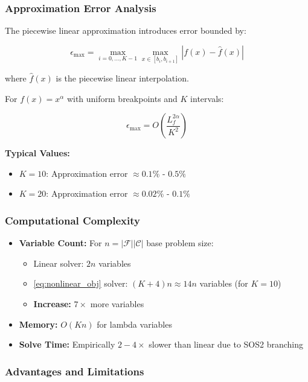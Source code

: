 \documentclass{article}
\begin{document}
\subsubsection{Approximation Error Analysis}

The piecewise linear approximation introduces error bounded by:

\begin{equation}
\epsilon_{\max} = \max_{i=0,\ldots,K-1} \max_{x \in [b_i, b_{i+1}]} |f(x) - \hat{f}(x)|
\end{equation}

where $\hat{f}(x)$ is the piecewise linear interpolation.

For $f(x) = x^\alpha$ with uniform breakpoints and $K$ intervals:

\begin{equation}
\epsilon_{\max} = O\left(\frac{L_f^{2\alpha}}{K^2}\right)
\end{equation}

\textbf{Typical Values:}
\begin{itemize}
    \item $K = 10$: Approximation error $\approx 0.1\%$ - $0.5\%$
    \item $K = 20$: Approximation error $\approx 0.02\%$ - $0.1\%$
\end{itemize}

\subsubsection{Computational Complexity}
\begin{itemize}
    \item \textbf{Variable Count:} For $n = |\mathcal{F}||\mathcal{C}|$ base problem size:
\begin{itemize}
    \item Linear solver: $2n$ variables
    \item \ref{eq:nonlinear_obj} solver: $(K+4)n \approx 14n$ variables (for $K=10$)
    \item \textbf{Increase:} $7\times$ more variables
\end{itemize}

\item \textbf{Memory:} $O(Kn)$ for lambda variables
\item \textbf{Solve Time:} Empirically $2-4\times$ slower than linear due to SOS2 branching
\end{itemize}


\subsubsection{Advantages and Limitations}
\end{document}
